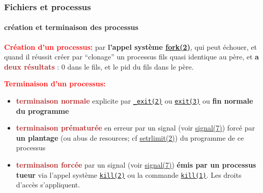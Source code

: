 \documentclass[xcolor=svgnames,final,smaller,a4]{beamer}
\begin{document}
\begin{frame}
  \frametitle{Fichiers et processus}
  \framesubtitle{création et terminaison des processus}

  \textbf{\textcolor{red}{Création d'un processus:}} par \textbf{l'appel
  système
  \href{https://man7.org/linux/man-pages/man2/fork.2.html}{fork(2)}},
  qui peut échouer, et quand il réussit créer par ``clonage'' un processus fils quasi
  identique au père, et \textbf{a \textcolor{FireBrick}{deux résultats}} : 0 dans le fils, et le pid
  du fils dans le père.

  \vspace{0.5cm}
  \textbf{\textcolor{red}{Terminaison d'un processus:}}

  \begin{itemize}
    \item \textbf{\textcolor{FireBrick}{terminaison normale}} explicite par
      \href{https://man7.org/linux/man-pages/man2/exit.2.html}{\texttt{\_exit(2)}} ou
      \href{https://man7.org/linux/man-pages/man3/exit.3.html}{\texttt{exit(3)}} ou \textbf{fin normale du programme}

    \item \textbf{\textcolor{FireBrick}{terminaison prématurée}} en
      erreur par un signal (voir
      \href{https://man7.org/linux/man-pages/man7/signal.7.html}{signal(7)})
      forcé par \textbf{un plantage} (ou abus de resources; cf \href{https://man7.org/linux/man-pages/man2/setrlimit.2.html}{setrlimit(2)}) du
      programme de ce processus {}
      
    \item \textbf{\textcolor{FireBrick}{terminaison forcée}} par un signal (voir 
  \href{https://man7.org/linux/man-pages/man7/signal.7.html}{signal(7)}) \textbf{émis par un processus tueur} via 
     l'appel système \href{https://man7.org/linux/man-pages/man2/kill.2.html}{\texttt{kill(2)}} ou la commande \href{https://man7.org/linux/man-pages/man1/kill.1.html}{\texttt{kill(1)}}. Les droits d'accès s'appliquent.
  \end{itemize}
  
\end{frame}
\end{document}

